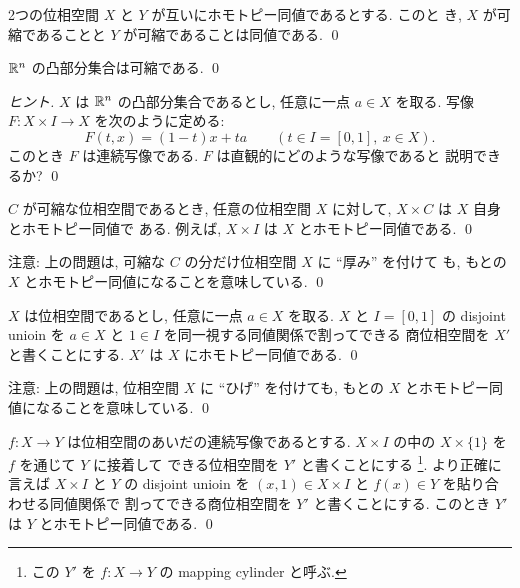 \documentclass[12pt,twoside]{jarticle}
\begin{document}
\begin{question}[容易]
  2つの位相空間 $X$ と $Y$ が互いにホモトピー同値であるとする. このと
  き, $X$ が可縮であることと $Y$ が可縮であることは同値である. \qed
\end{question}

\begin{question}
  ${\mathbb R}^n$ の凸部分集合は可縮である.
  \qed
\end{question}

\begin{proof}[ヒント]
$X$ は ${\mathbb R}^n$ の凸部分集合であるとし, 任意に一点 $a\in X$ を取る.
写像 $F:X\times I\to X$ を次のように定める:
\begin{equation*}
  F(t,x) = (1-t)x + ta \qquad (t\in I=[0,1],\ x\in X).
\end{equation*}
このとき $F$ は連続写像である.  $F$ は直観的にどのような写像であると
説明できるか? \qed
\end{proof}

\begin{question}
  $C$ が可縮な位相空間であるとき, 
  任意の位相空間 $X$ に対して, $X\times C$ は $X$ 自身とホモトピー同値で
  ある. 例えば, $X\times I$ は $X$ とホモトピー同値である. 
  \qed
\end{question}

\noindent
注意: 上の問題は, 可縮な $C$ の分だけ位相空間 $X$ に ``厚み'' を付けて
も, もとの $X$ とホモトピー同値になることを意味している. \qed

\begin{question}
  $X$ は位相空間であるとし, 任意に一点 $a\in X$ を取る.
  $X$ と $I=[0,1]$ の disjoint unioin 
  を $a\in X$ と $1\in I$ を同一視する同値関係で割ってできる
  商位相空間を $X'$ と書くことにする.
  $X'$ は $X$ にホモトピー同値である.
  \qed
\end{question}

\noindent
注意: 上の問題は, 位相空間 $X$ に ``ひげ'' を付けても, 
もとの $X$ とホモトピー同値になることを意味している. \qed

\begin{question}
  $f:X\to Y$ は位相空間のあいだの連続写像であるとする. 
  $X\times I$ の中の $X\times\{1\}$ を $f$ を通じて $Y$ に接着して
  できる位相空間を $Y'$ と書くことにする%
  \footnote{この $Y'$ を $f:X\to Y$ の mapping cylinder と呼ぶ.}. 
  より正確に言えば $X\times I$ と $Y$ の disjoint unioin を %
  $(x,1)\in X\times I$ と $f(x)\in Y$ を貼り合わせる同値関係で
  割ってできる商位相空間を $Y'$ と書くことにする.
  このとき $Y'$ は $Y$ とホモトピー同値である.
  \qed
\end{question}
\end{document}

